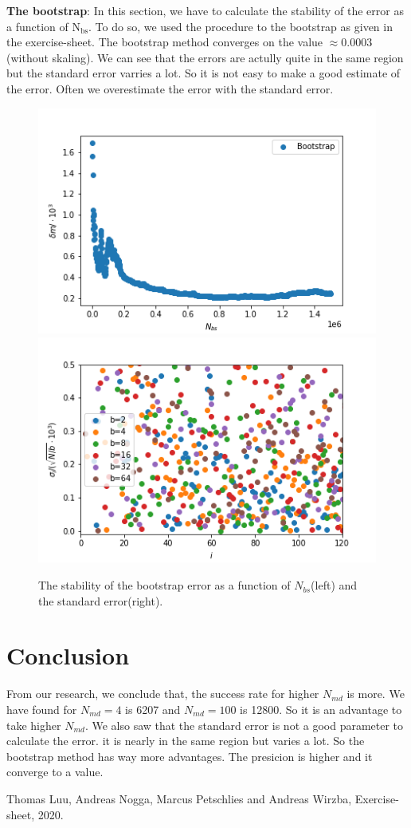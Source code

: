 \documentclass[11pt, a4paper, DIV=12]{scrartcl}
\begin{document}
\textbf{The bootstrap}: In this section, we have to calculate the stability of the error as a function of $ \text{N}_{\text{bs}} $. To do so, we used the procedure to the bootstrap as given in the exercise-sheet. The bootstrap method converges on the value $\approx 0.0003$(without skaling). We can see that the errors are actully quite in the same region but the standard error varries a lot. So it is not easy to make a good estimate of the error. Often we overestimate the error with the standard error.
	
	\begin{figure}[H]
		\centering
		\includegraphics[width=0.6\linewidth]{bootstrap.png}\includegraphics[width=0.6\linewidth]{blocking_standard_deviation_test.png}
		\caption{ The stability of the bootstrap error as a function of $ N_{bs} $(left) and the standard error(right).}
		\label{fig:boottrap}
	\end{figure}

\section{Conclusion}
From our research, we conclude that, the success rate for higher $ N_{md} $ is more. We have found for $ N_{md}=4$ is 6207 and $ N_{md}=100 $ is 12800. So it is an advantage to take higher $N_{md}$. We also saw that the standard error is not a good parameter to calculate the error. it is nearly in the same region but varies a lot. So the bootstrap method has way more advantages. The presicion is higher and it converge to a value.
	
\begin{thebibliography}{12}
Thomas Luu, Andreas Nogga, Marcus Petschlies and  Andreas Wirzba, Exercise-sheet, 2020. 
\end{thebibliography}	
\end{document}
